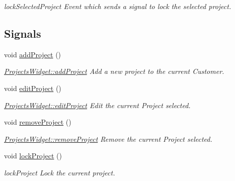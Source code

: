 \begin{DoxyCompactItemize}
\begin{DoxyCompactList}\small\item\em lock\-Selected\-Project Event which sends a signal to lock the selected project. \end{DoxyCompactList}\end{DoxyCompactItemize}
\subsection*{Signals}
\begin{DoxyCompactItemize}
\item 
\hypertarget{classGui_1_1Widgets_1_1ProjectsWidget_a25a20fde082c2698d7067d10e5795c0f}{void \hyperlink{classGui_1_1Widgets_1_1ProjectsWidget_a25a20fde082c2698d7067d10e5795c0f}{add\-Project} ()}\label{classGui_1_1Widgets_1_1ProjectsWidget_a25a20fde082c2698d7067d10e5795c0f}

\begin{DoxyCompactList}\small\item\em \hyperlink{classGui_1_1Widgets_1_1ProjectsWidget_a25a20fde082c2698d7067d10e5795c0f}{Projects\-Widget\-::add\-Project} Add a new project to the current Customer. \end{DoxyCompactList}\item 
\hypertarget{classGui_1_1Widgets_1_1ProjectsWidget_a8a49da147544ffd78131af2b9289c9d0}{void \hyperlink{classGui_1_1Widgets_1_1ProjectsWidget_a8a49da147544ffd78131af2b9289c9d0}{edit\-Project} ()}\label{classGui_1_1Widgets_1_1ProjectsWidget_a8a49da147544ffd78131af2b9289c9d0}

\begin{DoxyCompactList}\small\item\em \hyperlink{classGui_1_1Widgets_1_1ProjectsWidget_a8a49da147544ffd78131af2b9289c9d0}{Projects\-Widget\-::edit\-Project} Edit the current Project selected. \end{DoxyCompactList}\item 
\hypertarget{classGui_1_1Widgets_1_1ProjectsWidget_ac713b0c5c9afba988923fe3e29b405dc}{void \hyperlink{classGui_1_1Widgets_1_1ProjectsWidget_ac713b0c5c9afba988923fe3e29b405dc}{remove\-Project} ()}\label{classGui_1_1Widgets_1_1ProjectsWidget_ac713b0c5c9afba988923fe3e29b405dc}

\begin{DoxyCompactList}\small\item\em \hyperlink{classGui_1_1Widgets_1_1ProjectsWidget_ac713b0c5c9afba988923fe3e29b405dc}{Projects\-Widget\-::remove\-Project} Remove the current Project selected. \end{DoxyCompactList}\item 
\hypertarget{classGui_1_1Widgets_1_1ProjectsWidget_a070bc1f0c832b9e8a785b20636fd22f8}{void \hyperlink{classGui_1_1Widgets_1_1ProjectsWidget_a070bc1f0c832b9e8a785b20636fd22f8}{lock\-Project} ()}\label{classGui_1_1Widgets_1_1ProjectsWidget_a070bc1f0c832b9e8a785b20636fd22f8}

\begin{DoxyCompactList}\small\item\em lock\-Project Lock the current project. \end{DoxyCompactList}\end{DoxyCompactItemize}
